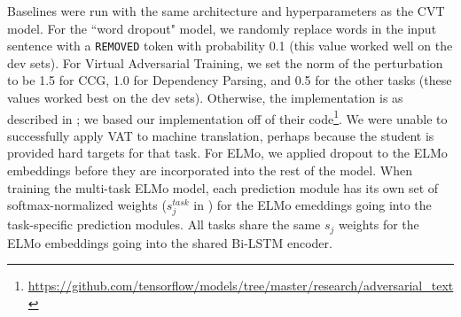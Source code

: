 \documentclass[11pt,a4paper]{article}
\newcommand{\xhdr}[1]{\vspace{1.7mm}\noindent{{\bf #1.}}}
\begin{document}
\xhdr{Baselines}
Baselines were run with the same architecture and hyperparameters as the CVT model. For the ``word dropout" model, we randomly replace words in the input sentence with a \texttt{REMOVED} token with probability 0.1 (this value worked well on the dev sets). For Virtual Adversarial Training, we set the norm of the perturbation to be 1.5 for CCG, 1.0 for Dependency Parsing, and 0.5 for the other tasks (these values worked best on the dev sets). Otherwise, the implementation is as described in \citep{miyato2016adversarial}; we based our implementation off of their code\footnote{\url{https://github.com/tensorflow/models/tree/master/research/adversarial_text}}. We were unable to successfully apply VAT to machine translation, perhaps because the student is provided hard targets for that task. 
For ELMo, we applied dropout to the ELMo embeddings before they are incorporated into the rest of the model.
When training the multi-task ELMo model, each prediction module has its own set of softmax-normalized weights ($s_j^{task}$ in \citep{peters2018deep}) for the ELMo emeddings going into the task-specific prediction modules. All tasks share the same $s_j$ weights for the ELMo embeddings going into the shared Bi-LSTM encoder. 
\end{document}
